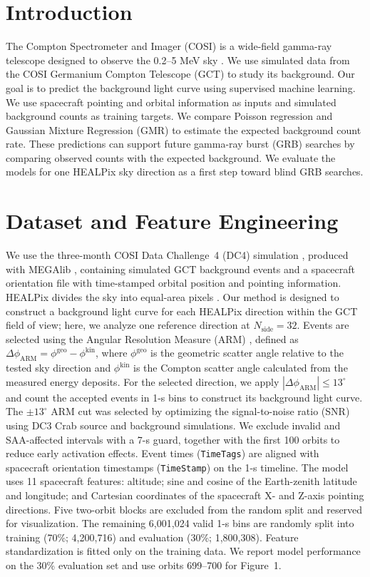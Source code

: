 \documentclass[11pt,twoside]{article}
\begin{document}
\section{Introduction}

The Compton Spectrometer and Imager (COSI) is a wide-field gamma-ray telescope designed to observe the 0.2--5 MeV sky
\citep{Tomsick2023}. We use simulated data from the COSI Germanium Compton Telescope (GCT) to study its background. 
Our goal is to predict the background light curve using supervised machine learning. We use spacecraft pointing and orbital information as inputs and simulated background counts as training targets. We compare Poisson regression and Gaussian Mixture Regression (GMR) to estimate the expected background count rate. These predictions can support future gamma-ray burst (GRB) searches by comparing observed counts with the expected background. We evaluate the models for one HEALPix sky direction as a first step
toward blind GRB searches.

\section{Dataset and Feature Engineering}

We use the three-month COSI Data Challenge~4 (DC4) simulation \citep{Karwin2026,Gallego2026}, produced with MEGAlib \citep{Zoglauer2006}, containing simulated GCT background events and a spacecraft orientation file with time-stamped orbital position and pointing information. HEALPix divides the sky into equal-area pixels \citep{Gorski2005}. Our method is designed to construct a background light curve for each HEALPix direction within the GCT field of view; here, we analyze one reference direction at $N_{\mathrm{side}}=32$. Events are selected using the Angular Resolution Measure (ARM) \citep{Kierans2024}, defined as $\Delta\phi_{\mathrm{ARM}}=\phi^{\mathrm{geo}}-\phi^{\mathrm{kin}}$, where $\phi^{\mathrm{geo}}$ is the geometric scatter angle relative to the tested sky direction and $\phi^{\mathrm{kin}}$ is the Compton scatter angle calculated from the measured energy deposits. For the selected direction, we apply $|\Delta\phi_{\mathrm{ARM}}|\leq13^\circ$ and count the accepted events in 1-s bins to construct its background light curve. 
The $\pm13^\circ$ ARM cut was selected by optimizing the signal-to-noise ratio (SNR) using DC3 Crab source and background simulations. We exclude invalid and SAA-affected intervals with a 7-s guard, together with the first 100 orbits to reduce early activation effects. Event times (\texttt{TimeTags}) are aligned with spacecraft orientation timestamps (\texttt{TimeStamp}) on the 1-s timeline. The model uses 11 spacecraft features: altitude; sine and cosine of the Earth-zenith latitude and longitude; and Cartesian coordinates of the spacecraft X- and Z-axis pointing directions. Five two-orbit blocks are excluded from the random split and reserved for visualization. The remaining 6,001,024 valid 1-s bins are randomly split into training (70\%; 4,200,716) and evaluation (30\%; 1,800,308). Feature standardization is fitted only on the training data. We report model performance on the 30\% evaluation set and use orbits 699--700 for Figure~1. 
\end{document}
